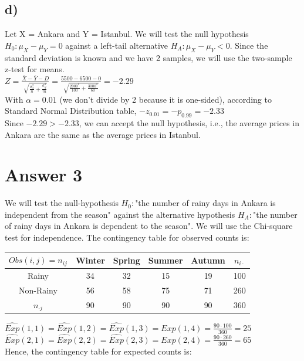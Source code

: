 \documentclass{article}
\begin{document}
\subsection*{d)}
Let X = Ankara and Y = Istanbul.
We will test the null hypothesis $H_0: \mu_X - \mu_Y = 0$ against a left-tail alternative $H_A: \mu_X - \mu_Y < 0.$
Since the standard deviation is known and we have 2 samples, we will use the two-sample z-test for means.\vspace{0.2cm}\\
$Z = \frac{\overline{X}-\overline{Y}-D}{\sqrt{\frac{\sigma_x^2}{n}+\frac{\sigma_y^2}{m}}} = \frac{5500 - 6500 - 0}{\sqrt{\frac{2000^2}{100}+\frac{3000^2}{60}}} = -2.29$\vspace{0.2cm}\\
With $\alpha = 0.01$ (we don't divide by 2 because it is one-sided), according to Standard Normal Distribution table, 
$-z_{0.01} = -p_{0.99} = -2.33$ \vspace{0.2cm}\\
Since $-2.29 > -2.33$, we can accept the null hypothesis, i.e., the average prices in Ankara are the same as the average prices in Istanbul.\vspace{1.5cm}\\

\section*{Answer 3}
We will test the null-hypothesis $H_0: $\;"the number of rainy days in Ankara is independent from the season" against the alternative hypothesis $H_A: $\;"the number of rainy days in Ankara is dependent to the season".
We will use the Chi-square test for independence. The contingency table for observed counts is:\vspace{0.2cm}\\

\begin{center}
\begin{tabular}{ c|c|c|c|c|c }
 $Obs(i,j)=n_{ij}$ & Winter & Spring & Summer & Autumn & $n_{i\cdot}$  \\
 \hline
 Rainy & 34 & 32 & 15 & 19 & 100 \\ 
 \hline
 Non-Rainy & 56 & 58 & 75 & 71 & 260 \\ 
 \hline
 $n_{\cdot j}$ & 90 & 90 & 90 & 90 & 360 \\ 
 \hline
\end{tabular}
\end{center}\vspace{0.2cm}
\hspace{-0.1cm}
$\widehat{Exp}(1,1) = \widehat{Exp}(1,2) = \widehat{Exp}(1,3) = \widehat{Exp}(1,4) = \frac{90\cdot 100}{360} = 25$\vspace{0.2cm}\\
$\widehat{Exp}(2,1) = \widehat{Exp}(2,2) = \widehat{Exp}(2,3) = \widehat{Exp}(2,4) = \frac{90\cdot 260}{360} = 65$\vspace{0.2cm}\\
Hence, the contingency table for expected counts is:\vspace{0.2cm}\\
\end{document}
